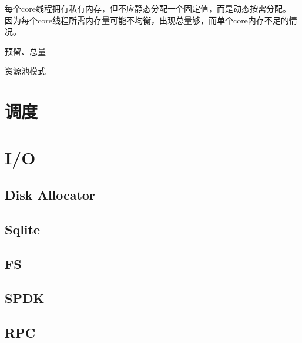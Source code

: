 每个core线程拥有私有内存，但不应静态分配一个固定值，而是动态按需分配。
因为每个core线程所需内存量可能不均衡，出现总量够，而单个core内存不足的情况。

预留、总量

资源池模式

\section{调度}

\section{I/O}

\subsection{Disk Allocator}

\subsection{Sqlite}

\subsection{FS}

\subsection{SPDK}

\subsection{RPC}
